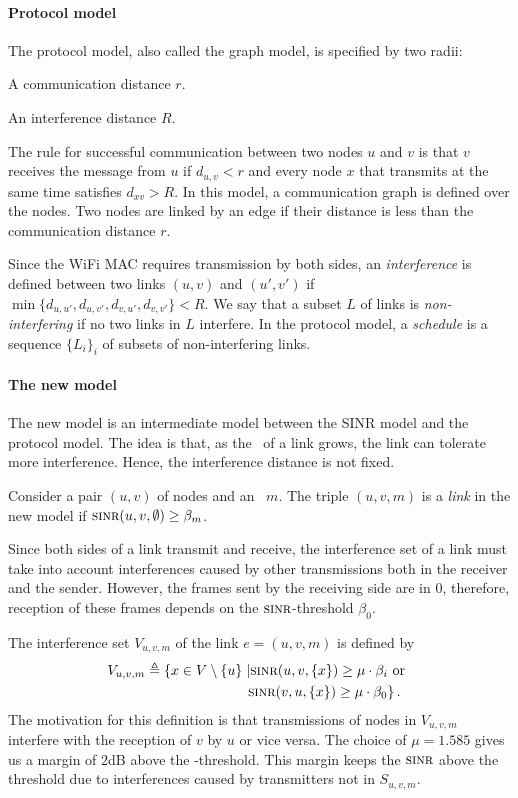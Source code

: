 \documentclass[12pt]{article}
\newenvironment{proof sketch}[1]{\noindent {\emph{Proof sketch of #1:}}}{\hfill \qed}
\newcommand{\eqdf}{\triangleq}
\newcommand{\SINR}{\text{\sc{sinr}}}
\newcommand{\SNR}{\text{\sc{snr}}}
\newcommand{\MCS}{\text{\sc{mcs}}}
\begin{document}
\paragraph{Protocol model}
The protocol model, also called the graph model, is specified by two
radii:
\begin{inparaenum}[(i)]
\item A communication distance $r$.
\item An interference distance $R$.
\end{inparaenum}
The rule for successful communication between two nodes $u$ and $v$ is
that $v$ receives the message from $u$ if $d_{u,v}<r$ and every node
$x$ that transmits at the same time satisfies $d_{xv}> R$.  In this
model, a communication graph is defined over the nodes.  Two nodes are
linked by an edge if their distance is less than the communication
distance $r$.

Since the WiFi MAC requires transmission by both sides, an
\emph{interference} is defined between two links $(u,v)$ and $(u',v')$
if $\min\{d_{u,u'},d_{u,v'}, d_{v,u'}, d_{v,v'}\} < R$.  We say that a
subset $L$ of links is \emph{non-interfering} if no two links in $L$
interfere.  In the protocol model, a \emph{schedule} is a sequence
$\{L_i\}_i$ of subsets of non-interfering links.


\paragraph{The new model}
The new model is an intermediate model between the SINR model and the
protocol model. The idea is that, as the \SNR\ of a link grows, the
link can tolerate more interference. Hence, the interference distance
is not fixed.

Consider a pair $(u,v)$ of nodes and an \MCS\ $m$.
The triple $(u,v,m)$ is a \emph{link} in the new model if
$\SINR(u,v,\emptyset) \geq \beta_m$.

Since both sides of a link transmit and receive, the interference set
of a link must take into account interferences caused by other
transmissions both in the receiver and the sender. However, the frames
sent by the receiving side are in \MCS $0$, therefore, reception of
these frames depends on the $\SINR$-threshold $\beta_0$.

The interference set $V_{u,v,m}$ of the link $e=(u,v,m)$ is defined by
  \begin{align*}
    V_{u,v,m} \eqdf \left\{ x \in V \setminus\{u\}\right. &\left | \SINR(u,v,\{x\}) \geq \mu  \cdot \beta_i \text{ or } \right. \\
    & \left.\SINR(v,u,\{x\}) \geq \mu \cdot \beta_0\right\}.
\end{align*}
The motivation for this definition is that transmissions of nodes in $V_{u,v,m}$ interfere with
the reception of $v$ by $u$ or vice versa.
The choice of $\mu=1.585$ gives us a margin of $2$dB above the
\SINR-threshold.  This margin keeps the $\SINR$ above the threshold
due to interferences caused by transmitters not in $S_{u,v,m}$.
\end{document}
